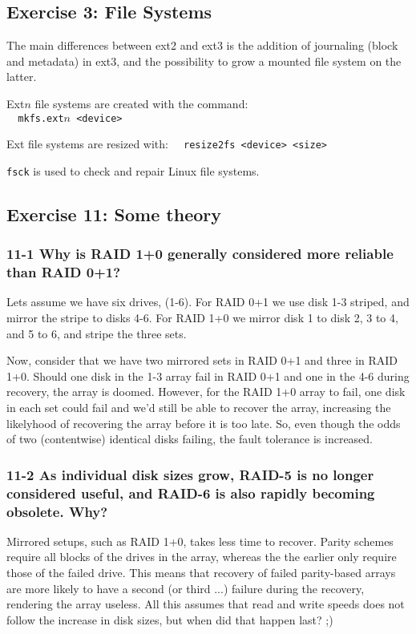 \subsection{Exercise 3: File Systems}

The main differences between ext2 and ext3 is the addition of journaling (block and metadata) in ext3, and the possibility to grow a mounted file system on the latter.

Ext$n$ file systems are created with the command: \\
\verb=  mkfs.ext=$n$\verb= <device>=

Ext file systems are resized with:
\verb=  resize2fs <device> <size>=

\verb=fsck= is used to check and repair Linux file systems.

\subsection{Exercise 11: Some theory}
\subsubsection{11-1 Why is RAID 1+0 generally considered more reliable than RAID 0+1?}
Lets assume we have six drives, (1-6). For RAID 0+1 we use disk 1-3 striped, and mirror the stripe to disks 4-6. For RAID 1+0 we mirror disk 1 to disk 2, 3 to 4, and 5 to 6, and stripe the three sets.

Now, consider that we have two mirrored sets in RAID 0+1 and three in RAID 1+0. Should one disk in the 1-3 array fail in RAID 0+1 and one in the 4-6 during recovery, the array is doomed. However, for the RAID 1+0 array to fail, one disk in each set could fail and we'd still be able to recover the array, increasing the likelyhood of recovering the array before it is too late. So, even though the odds of two (contentwise) identical disks failing, the fault tolerance is increased.

\subsubsection{11-2 As individual disk sizes grow, RAID-5 is no longer considered useful, and RAID-6 is also rapidly becoming obsolete. Why?}
Mirrored setups, such as RAID 1+0, takes less time to recover. Parity schemes require all blocks of the drives in the array, whereas the the earlier only require those of the failed drive. This means that recovery of failed parity-based arrays are more likely to have a second (or third ...) failure during the recovery, rendering the array useless. All this assumes that read and write speeds does not follow the increase in disk sizes, but when did that happen last? ;)

